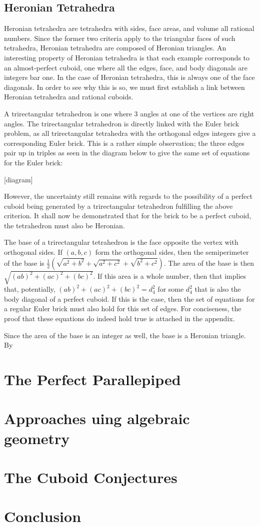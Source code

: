 \documentclass[11pt]{article}
\begin{document}
\subsection{Heronian Tetrahedra}
Heronian tetrahedra are tetrahedra with sides, face areas, and volume all rational numbers. Since the former two criteria apply to the triangular faces of such tetrahedra, Heronian tetrahedra are composed of Heronian triangles. An interesting property of Heronian tetrahedra is that each example corresponds to an almost-perfect cuboid, one where all the edges, face, and body diagonals are integers bar one. In the case of Heronian tetrahedra, this is always one of the face diagonals. In order to see why this is so, we must first establish a link between Heronian tetrahedra and rational cuboids.

A trirectangular tetrahedron is one where 3 angles at one of the vertices are right angles. The trirectangular tetrahedron is directly linked with the Euler brick problem, as all trirectangular tetrahedra with the orthogonal edges integers give a corresponding Euler brick. This is a rather simple observation; the three edges pair up in triples as seen in the diagram below to give the same set of equations for the Euler brick:

[diagram]

However, the uncertainty still remains with regards to the possibility of a perfect cuboid being generated by a trirectangular tetrahedron fulfilling the above criterion. It shall now be demonstrated that for the brick to be a perfect cuboid, the tetrahedron must also be Heronian. 

The base of a trirectangular tetrahedron is the face opposite the vertex with orthogonal sides. If $(a, b, c)$ form the orthogonal sides, then the semiperimeter of the base is $\frac{1}{2}\left(\sqrt{a^2+b^2}+\sqrt{a^2+c^2}+\sqrt{b^2+c^2}\right)$. The area of the base is then $\sqrt{(ab)^2+(ac)^2+(bc)^2}$. If this area is a whole number, then that implies that, potentially, $(ab)^2+(ac)^2+(bc)^2=d_4^2$ for some $d_4^2$ that is also the body diagonal of a perfect cuboid. If this is the case, then the set of equations for a regular Euler brick must also hold for this set of edges. For conciseness, the proof that these equations do indeed hold true is attached in the appendix.

Since the area of the base is an integer as well, the base is a Heronian triangle. By 
\section{The Perfect Parallepiped}
\section{Approaches uing algebraic geometry}
\section{The Cuboid Conjectures}
\section{Conclusion}
\newpage

 
\end{document}

